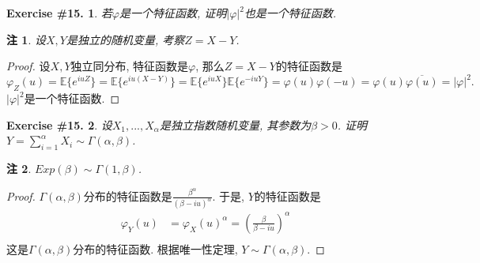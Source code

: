 \documentclass[UTF8, a4paper]{article}
\newtheorem{exercise}{Exercise \#15.}
\newtheorem*{remark}{注}
\begin{document}
\begin{framed}
\begin{exercise}
若\(\varphi\)是一个特征函数, 证明\(|\varphi|^2\)也是一个特征函数.
\end{exercise}
\begin{remark}
设\(X,Y\)是独立的随机变量, 考察\(Z = X - Y\).
\end{remark}
\end{framed}

\begin{proof}
设\(X, Y\)独立同分布, 特征函数是\(\varphi\), 那么\(Z = X-Y\)的特征函数是
$$
\varphi_Z(u) = \mathbb{E}\{e^{i u Z}\} = \mathbb{E}\{e^{i u (X-Y)}\} = \mathbb{E}\{e^{i u X}\}\mathbb{E}\{e^{-i u Y}\} = \varphi(u)\varphi(-u) = \varphi(u)\overline{\varphi(u)} = |\varphi|^2.
$$
\(|\varphi|^2\)是一个特征函数.
\end{proof}

\begin{framed}
\begin{exercise}
设\(X_1, ..., X_\alpha\)是独立指数随机变量, 其参数为\(\beta > 0\).
证明\(Y = \sum_{i=1}^{\alpha} X_i \sim \Gamma(\alpha, \beta)\).
\end{exercise}
\end{framed}

\begin{remark}
\(Exp(\beta) \sim \Gamma(1, \beta)\).
\end{remark}

\begin{proof}
\(\Gamma(\alpha, \beta)\)分布的特征函数是\(\frac{\beta^\alpha}{(\beta - iu)^\alpha}\).
于是, \(Y\)的特征函数是
$$
\begin{aligned}
\varphi_Y(u) &= \varphi_X(u)^\alpha=  \left(\frac{\beta}{\beta - iu}\right)^\alpha \\
\end{aligned}
$$
这是\(\Gamma(\alpha, \beta)\)分布的特征函数. 根据唯一性定理, \(Y \sim \Gamma(\alpha, \beta)\).

\end{proof}





\end{document}
